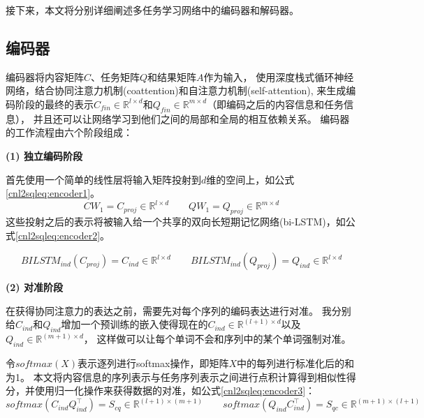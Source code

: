 接下来，本文将分别详细阐述多任务学习网络中的编码器和解码器。

\subsection{编码器}
\label{cnl2sql:encoder}

编码器将内容矩阵$C$、任务矩阵$Q$和结果矩阵$A$作为输入，
使用深度栈式循环神经网络，结合协同注意力机制(coattention)和自注意力机制(self-attention),
来生成编码阶段的最终的表示$C_{fin} \in \mathbb{R}^{l \times d}$和$Q_{fin} \in \mathbb{R}^{m \times d}$（即编码之后的内容信息和任务信息），
并且还可以让网络学习到他们之间的局部和全局的相互依赖关系。
编码器的工作流程由六个阶段组成：

\textbf{(1) 独立编码阶段}

首先使用一个简单的线性层将输入矩阵投射到$d$维的空间上，如公式\ref{cnl2sqleq:encoder1}。
\begin{equation}
    \label{cnl2sqleq:encoder1}
    CW_1 = C_{proj} \in \mathbb{R}^{l \times d} \qquad QW_1 = Q_{proj} \in \mathbb{R}^{m \times d} 
  \end{equation}
这些投射之后的表示将被输入给一个共享的双向长短期记忆网络(bi-LSTM)\cite{hochreiter1997long,graves2005framewise}，如公式\ref{cnl2sqleq:encoder2}。

\begin{equation}
    \label{cnl2sqleq:encoder2}
    BILSTM_{ind}(C_{proj}) = C_{ind} \in \mathbb{R}^{l \times d} \qquad BILSTM_{ind}(Q_{proj}) = Q_{ind} \in \mathbb{R}^{l \times d}
\end{equation}

\textbf{(2) 对准阶段}

在获得协同注意力的表达之前，需要先对每个序列的编码表达进行对准。
我分别给$C_{ind}$和$Q_{ind}$增加一个预训练的嵌入使得现在的$C_{ind} \in \mathbb{R}^{(l+1) \times d}$以及$Q_{ind} \in \mathbb{R}^{(m+1) \times d}$，
这样做可以让每个单词不会和序列中的某个单词强制对准。

令$softmax(X)$表示逐列进行softmax操作，即矩阵$X$中的每列进行标准化后的和为1。
本文将内容信息的序列表示与任务序列表示之间进行点积计算得到相似性得分，并使用归一化操作来获得数据的对准，如公式\ref{cnl2sqleq:encoder3}：
\begin{equation}
  \label{cnl2sqleq:encoder3}
  softmax(C_{ind}Q_{ind}^{\top}) = S_{cq} \in \mathbb{R}^{(l+1) \times (m+1)} \qquad softmax(Q_{ind}C_{ind}^{\top}) = S_{qc} \in \mathbb{R}^{(m+1) \times (l+1)}
\end{equation}

